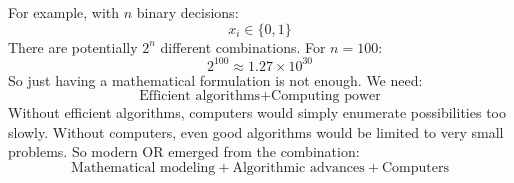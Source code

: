 \highspace
For example, with $n$ binary decisions:
\begin{equation*}
    x_i\in\{0,1\}
\end{equation*}
There are potentially $2^n$ different combinations. For $n=100$:
\begin{equation*}
    2^{100}
    \approx 1.27\times 10^{30}
\end{equation*}
So just having a mathematical formulation is not enough. We need:
\begin{equation*}
    \text{Efficient algorithms}
    +
    \text{Computing power}
\end{equation*}
Without efficient algorithms, computers would simply enumerate possibilities too slowly. Without computers, even good algorithms would be limited to very small problems. So modern OR emerged from the combination:
\begin{equation*}
    \text{Mathematical modeling}
    +
    \text{Algorithmic advances}
    +
    \text{Computers}
\end{equation*}
